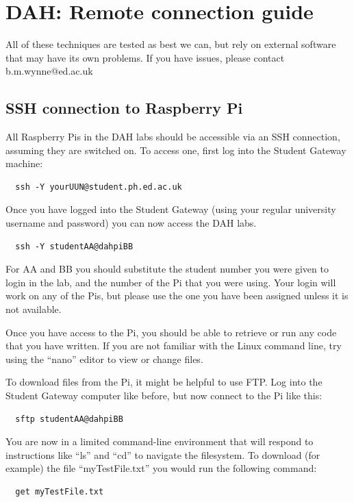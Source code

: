 \chapter{DAH: Remote connection guide}
\label{sec:remote}

All of these techniques are tested as best we can, but rely on external software that may have its own problems.
If you have issues, please contact b.m.wynne@ed.ac.uk

\section{SSH connection to Raspberry Pi}

All Raspberry Pis in the DAH labs should be accessible via an SSH connection, assuming they are switched on.
To access one, first log into the Student Gateway machine:
\begin{verbatim}
  ssh -Y yourUUN@student.ph.ed.ac.uk
\end{verbatim}

Once you have logged into the Student Gateway (using your regular university username and password) you can now access the DAH labs.
\begin{verbatim}
  ssh -Y studentAA@dahpiBB
\end{verbatim}

For AA and BB you should substitute the student number you were given to login in the lab, and the number of the Pi that you were using.
Your login will work on any of the Pis, but please use the one you have been assigned unless it is not available.

Once you have access to the Pi, you should be able to retrieve or run any code that you have written.
If you are not familiar with the Linux command line, try using the ``nano'' editor to view or change files.

To download files from the Pi, it might be helpful to use FTP.
Log into the Student Gateway computer like before, but now connect to the Pi like this:
\begin{verbatim}
  sftp studentAA@dahpiBB
\end{verbatim}

You are now in a limited command-line environment that will respond to instructions like ``ls'' and ``cd'' to navigate the filesystem.
To download (for example) the file ``myTestFile.txt'' you would run the following command:
\begin{verbatim}
  get myTestFile.txt
\end{verbatim}

